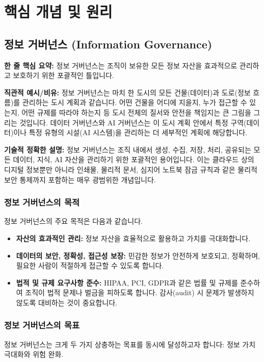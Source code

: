 \documentclass[11pt,a4paper]{article}
\theoremstyle{definition}
\begin{document}
\newpage
\section*{핵심 개념 및 원리}

\subsection*{정보 거버넌스 (Information Governance)}

\begin{keyconceptbox}
\textbf{한 줄 핵심 요약:} 정보 거버넌스는 조직이 보유한 모든 정보 자산을 효과적으로 관리하고 보호하기 위한 포괄적인 틀입니다.
\end{keyconceptbox}

\textbf{직관적 예시/비유:}
정보 거버넌스는 마치 한 도시의 모든 건물(데이터)과 도로(정보 흐름)를 관리하는 도시 계획과 같습니다. 어떤 건물을 어디에 지을지, 누가 접근할 수 있는지, 어떤 규제를 따라야 하는지 등 도시 전체의 질서와 안전을 책임지는 큰 그림을 그리는 것입니다. 데이터 거버넌스와 AI 거버넌스는 이 도시 계획 안에서 특정 구역(데이터)이나 특정 유형의 시설(AI 시스템)을 관리하는 더 세부적인 계획에 해당합니다.

\textbf{기술적 정확한 설명:}
정보 거버넌스는 조직 내에서 생성, 수집, 저장, 처리, 공유되는 모든 데이터, 지식, AI 자산을 관리하기 위한 포괄적인 용어입니다. 이는 클라우드 상의 디지털 정보뿐만 아니라 인쇄물, 물리적 문서, 심지어 노트북 잠금 규칙과 같은 물리적 보안 통제까지 포함하는 매우 광범위한 개념입니다.

\subsubsection*{정보 거버넌스의 목적}
정보 거버넌스의 주요 목적은 다음과 같습니다.
\begin{itemize}
    \item \textbf{자산의 효과적인 관리:} 정보 자산을 효율적으로 활용하고 가치를 극대화합니다.
    \item \textbf{데이터의 보안, 정확성, 접근성 보장:} 민감한 정보가 안전하게 보호되고, 정확하며, 필요한 사람이 적절하게 접근할 수 있도록 합니다.
    \item \textbf{법적 및 규제 요구사항 준수:} HIPAA, PCI, GDPR과 같은 법률 및 규제를 준수하여 조직이 법적 문제나 벌금을 피하도록 합니다. 감사(audit) 시 문제가 발생하지 않도록 대비하는 것이 중요합니다.
\end{itemize}

\subsubsection*{정보 거버넌스의 목표}
정보 거버넌스는 크게 두 가지 상충하는 목표를 동시에 달성하고자 합니다: 정보 가치 극대화와 위험 완화.
\end{document}
